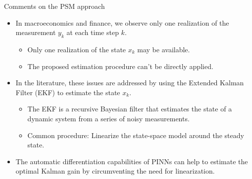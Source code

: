 \begin{frame}{Comments on the PSM approach}
\begin{itemize}
    \item In macroeconomics and finance, we observe only one realization of the measurement \(y_k\) at each time step \(k\).
    \begin{itemize}
        \item Only one realization of the state \(x_k\) may be available.
        \item The proposed estimation procedure can't be directly applied.
    \end{itemize}
    \item In the literature, these issues are addressed by using the Extended Kalman Filter (EKF) to estimate the state \(x_k\).
    \begin{itemize}
        \item The EKF is a recursive Bayesian filter that estimates the state of a dynamic system from a series of noisy measurements.
        \item Common procedure: Linearize the state-space model around the steady state.
    \end{itemize}
    \item The automatic differentiation capabilities of PINNs can help to estimate the optimal Kalman gain by circumventing the need for linearization.
\end{itemize}
\end{frame}
    